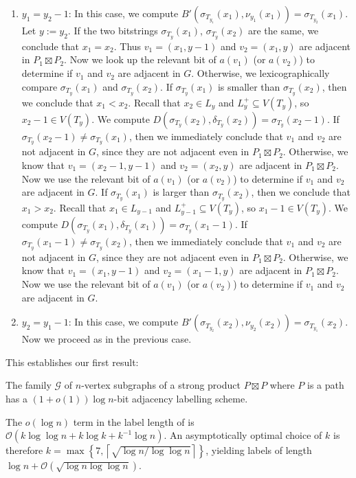 \documentclass[10pt, conference, compsocconf]{IEEEtran}
\newcommand{\Oh}{\mathcal{O}}
\begin{document}
\begin{enumerate}
  \item $y_1=y_2-1$:
  In this case, we compute $B'(\sigma_{T_{y_1}}(x_1), \nu_{y_1}(x_1))=\sigma_{T_{y_2}}(x_1)$.
  Let $y:=y_2$.
  If the two bitstrings $\sigma_{T_y}(x_1)$, $\sigma_{T_y}(x_2)$ are the same,
  we conclude that $x_1=x_2$. Thus $v_1=(x_1,y-1)$ and $v_2=(x_1,y)$ are adjacent in $P_1\boxtimes P_2$.
  Now we look up the relevant bit of $a(v_1)$ (or $a(v_2)$) to determine
  if $v_1$ and $v_2$ are adjacent in $G$.
  Otherwise, we lexicographically compare $\sigma_{T_y}(x_1)$ and $\sigma_{T_y}(x_2)$.
  If $\sigma_{T_y}(x_1)$ is smaller than $\sigma_{T_y}(x_2)$, then we conclude that $x_1<x_2$.
  Recall that $x_2 \in L_y$ and $L^+_y\subseteq V(T_y)$, so $x_2-1 \in V(T_y)$.
  We compute $D(\sigma_{T_y}(x_2),\delta_{T_y}(x_2))=\sigma_{T_y}(x_2-1)$.
  If $\sigma_{T_y}(x_2-1)\neq \sigma_{T_y}(x_1)$, then we immediately conclude that $v_1$ and $v_2$ are not adjacent in $G$, since they are not adjacent even in $P_1\boxtimes P_2$.  Otherwise, we know that
  $v_1=(x_2-1,y-1)$ and $v_2=(x_2,y)$ are adjacent in $P_1\boxtimes P_2$.
  Now we use the relevant bit of $a(v_1)$ (or $a(v_2)$) to determine if $v_1$ and $v_2$ are adjacent in $G$.
  If $\sigma_{T_y}(x_1)$ is larger than $\sigma_{T_y}(x_2)$, then we conclude that $x_1>x_2$.
  Recall that $x_1 \in L_{y-1}$ and $L^+_{y-1}\subseteq V(T_y)$, so $x_1-1 \in V(T_y)$.
  We compute $D(\sigma_{T_{y}}(x_1),\delta_{T_{y}}(x_1))=\sigma_{T_y}(x_1-1)$.
  If $\sigma_{T_y}(x_1-1)\neq \sigma_{T_y}(x_2)$, then we immediately conclude that $v_1$ and $v_2$ are not adjacent in $G$, since they are not adjacent even in $P_1\boxtimes P_2$.
  Otherwise, we know that
  $v_1=(x_1,y-1)$ and $v_2=(x_1-1,y)$ are adjacent in $P_1\boxtimes P_2$.
  Now we use the relevant bit of $a(v_1)$ (or $a(v_2)$) to determine if $v_1$ and $v_2$ are adjacent in $G$.
  \item $y_2=y_1-1$: In this case, we compute $B'(\sigma_{T_{y_2}}(x_2),\nu_{y_2}(x_2))=\sigma_{T_{y_1}}(x_2)$.  Now we proceed as in the previous case.
\end{enumerate}

This establishes our first result:

\begin{thm}
  The family $\mathcal{G}$ of $n$-vertex subgraphs of a strong product $P\boxtimes P$ where $P$ is a path has a $(1+o(1))\log n$-bit adjacency labelling scheme.
\end{thm}

\begin{rem}
  The $o(\log n)$ term in the label length of  is $\Oh(k\log\log n + k \log k + k^{-1}\log n)$.  An asymptotically optimal choice of $k$ is therefore $k=\max\left\{7,\left\lceil\sqrt{\log n / \log\log n}\right\rceil\right\}$, yielding labels of length $\log n + \Oh\left(\sqrt{\log n\log\log n}\right)$.
\end{rem}
\end{document}
